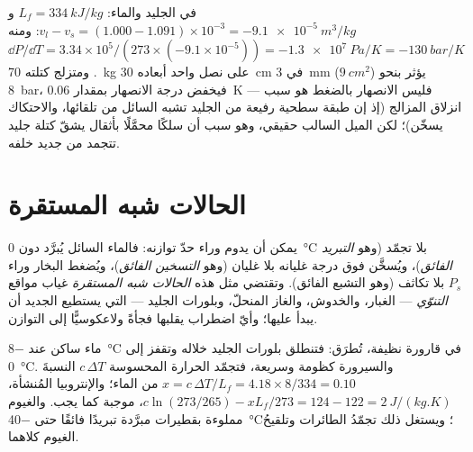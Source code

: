 \begin{example}\label{ex:b1:phase-changes:skate}
في الجليد والماء: $L_f = \qty{334}{kJ/kg}$ و $v_l - v_s = (1.000 - 1.091)
\times 10^{-3} = \qty{-9.1e-5}{m^3/kg}$: ومنه $\dd P/\dd T = 3.34 \times 10^5/(273 \times
(-9.1 \times 10^{-5})) = \qty{-1.3e7}{Pa/K} = \qty{-130}{bar/K}$. ومتزلج كتلته \qty{70}{kg}
على نصل واحد أبعاده \qty{30}{cm} في \qty{3}{mm} ($\qty{9}{cm^2}$) يؤثر
بنحو \qty{8}{bar}، فيخفض درجة الانصهار بمقدار \qty{0.06}{K} --- فليس الانصهار بالضغط هو سبب انزلاق المزالج (إذ إن طبقة
سطحية رفيعة من الجليد تشبه السائل من تلقائها، والاحتكاك يسخّن)؛
لكن الميل السالب حقيقي، وهو سبب أن سلكًا محمَّلًا
بأثقال يشقّ كتلة جليد تتجمد من جديد خلفه.
\end{example}

\section{الحالات شبه المستقرة}

\begin{definition}\label{def:b1:phase-changes:metastable}
يمكن  أن يدوم وراء حدّ توازنه: فالماء السائل
يُبرَّد دون \qty{0}{\degreeCelsius} بلا تجمّد (وهو \emph{التبريد الفائق})،
ويُسخَّن فوق درجة غليانه بلا غليان (وهو \emph{التسخين الفائق})،
ويُضغط البخار وراء $P_s$ بلا تكاثف (وهو التشبع الفائق).
وتقتضي مثل هذه \emph{الحالات شبه المستقرة} غياب مواقع
\emph{التنوّي} --- الغبار، والخدوش، والغاز المنحلّ، وبلورات الجليد --- التي
يستطيع  الجديد أن يبدأ عليها؛ وأيّ اضطراب يقلبها فجأةً ولاعكوسيًّا
إلى التوازن.
\end{definition}

\begin{example}\label{ex:b1:phase-changes:supercooled}
ماء ساكن عند \qty{-8}{\degreeCelsius} في قارورة نظيفة، تُطرَق: فتنطلق
بلورات الجليد خلاله وتقفز  إلى
\qty{0}{\degreeCelsius}. والسيرورة كظومة وسريعة، فتجمّد الحرارة
المحسوسة $c\,\Delta T$ النسبةَ $x = c\,\Delta T/L_f = 4.18 \times 8/334 =
0.10$ من الماء؛ والإنتروبيا المُنشأة، $c\ln(273/265) - xL_f/273 =
124 - 122 = \qty{+2}{J/(kg.K)}$، موجبة كما يجب. والغيوم
مملوءة بقطيرات مبرَّدة تبريدًا فائقًا حتى \qty{-40}{\degreeCelsius}؛ ويستغل ذلك
تجمّدُ الطائرات وتلقيحُ الغيوم كلاهما.
\end{example}


